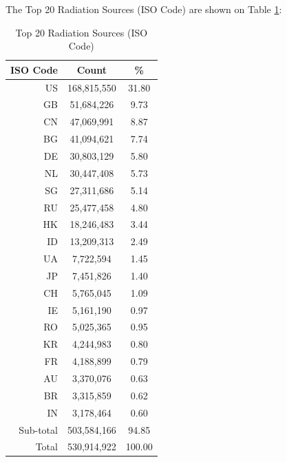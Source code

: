 \newpage
The Top 20 Radiation Sources (ISO Code) are shown on Table \ref{tab:top20radiationsources(isocode)}:
\begin{table}[!h]
\begin{center}
\caption{Top 20 Radiation Sources (ISO Code)}
\label{tab:top20radiationsources(isocode)}
\begin{tabular}{ |r|c|c| }
\hline
\centering ISO Code & Count & \%  \\
\hline
US & 168,815,550 & 31.80  \\
GB & 51,684,226 & 9.73  \\
CN & 47,069,991 & 8.87  \\
BG & 41,094,621 & 7.74  \\
DE & 30,803,129 & 5.80  \\
NL & 30,447,408 & 5.73  \\
SG & 27,311,686 & 5.14  \\
RU & 25,477,458 & 4.80  \\
HK & 18,246,483 & 3.44  \\
ID & 13,209,313 & 2.49  \\
UA & 7,722,594 & 1.45  \\
JP & 7,451,826 & 1.40  \\
CH & 5,765,045 & 1.09  \\
IE & 5,161,190 & 0.97  \\
RO & 5,025,365 & 0.95  \\
KR & 4,244,983 & 0.80  \\
FR & 4,188,899 & 0.79  \\
AU & 3,370,076 & 0.63  \\
BR & 3,315,859 & 0.62  \\
IN & 3,178,464 & 0.60  \\
\hline
Sub-total & 503,584,166 & 94.85  \\
\hline
Total & 530,914,922 & 100.00  \\
\hline
\end{tabular}
\end{center}
\end{table}

